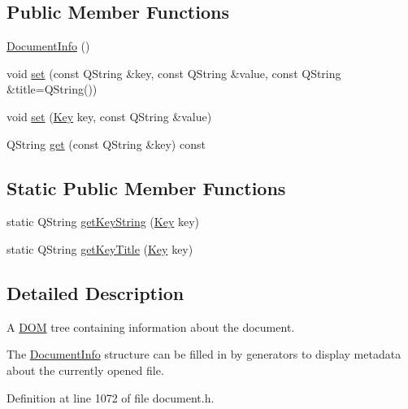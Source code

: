 \subsection*{Public Member Functions}
\begin{DoxyCompactItemize}
\item 
\hyperlink{classOkular_1_1DocumentInfo_acb4fd69463f64aeeb174614587514d01}{Document\+Info} ()
\item 
void \hyperlink{classOkular_1_1DocumentInfo_a8bd5403394ab192f1103cbf2a8e48d9b}{set} (const Q\+String \&key, const Q\+String \&value, const Q\+String \&title=Q\+String())
\item 
void \hyperlink{classOkular_1_1DocumentInfo_ad99d98a5506437524c081e7459a5b1c6}{set} (\hyperlink{classOkular_1_1DocumentInfo_a3a6e5f7fb246e29bcb2e830b6f770791}{Key} key, const Q\+String \&value)
\item 
Q\+String \hyperlink{classOkular_1_1DocumentInfo_a568ea22f19b034255be4c19f55ab1d82}{get} (const Q\+String \&key) const 
\end{DoxyCompactItemize}
\subsection*{Static Public Member Functions}
\begin{DoxyCompactItemize}
\item 
static Q\+String \hyperlink{classOkular_1_1DocumentInfo_a70cb5aa15e85e1690c7793ee9f4832b2}{get\+Key\+String} (\hyperlink{classOkular_1_1DocumentInfo_a3a6e5f7fb246e29bcb2e830b6f770791}{Key} key)
\item 
static Q\+String \hyperlink{classOkular_1_1DocumentInfo_a488083cfce0989e5ec7bc5a1af55a111}{get\+Key\+Title} (\hyperlink{classOkular_1_1DocumentInfo_a3a6e5f7fb246e29bcb2e830b6f770791}{Key} key)
\end{DoxyCompactItemize}


\subsection{Detailed Description}
A \hyperlink{namespaceDOM}{D\+O\+M} tree containing information about the document. 

The \hyperlink{classOkular_1_1DocumentInfo}{Document\+Info} structure can be filled in by generators to display metadata about the currently opened file. 

Definition at line 1072 of file document.\+h.




